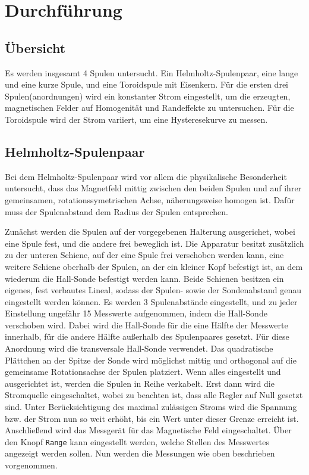\section{Durchführung}
\label{sec:Durchführung}
\subsection{Übersicht}
Es werden insgesamt 4 Spulen untersucht. Ein Helmholtz-Spulenpaar, eine lange und eine kurze Spule, und eine Toroidspule mit Eisenkern.
Für die ersten drei Spulen(anordnungen) wird ein konstanter Strom eingestellt, um die erzeugten, magnetischen Felder auf Homogenität und Randeffekte zu untersuchen.
Für die Toroidspule wird der Strom variiert, um eine Hysteresekurve zu messen.

\subsection{Helmholtz-Spulenpaar}
Bei dem Helmholtz-Spulenpaar wird vor allem die physikalische Besonderheit untersucht, dass das Magnetfeld mittig zwischen den beiden Spulen und auf
ihrer gemeinsamen, rotationssymetrischen Achse, näherungsweise homogen ist. Dafür muss der Spulenabstand dem Radius der Spulen entsprechen.

Zunächst werden die Spulen auf der vorgegebenen Halterung ausgerichet, wobei eine Spule fest, und die andere frei beweglich ist. Die Apparatur besitzt zusätzlich zu der unteren Schiene, 
auf der eine Spule frei verschoben werden kann, eine weitere Schiene oberhalb der Spulen, an der ein kleiner Kopf befestigt ist, an dem wiederum die Hall-Sonde befestigt werden kann.
Beide Schienen besitzen ein eigenes, fest verbautes Lineal, sodass der Spulen- sowie der Sondenabstand genau eingestellt werden können.
Es werden 3 Spulenabstände eingestellt, und zu jeder Einstellung ungefähr 15 Messwerte aufgenommen, indem die Hall-Sonde verschoben wird. Dabei wird die Hall-Sonde für die eine Hälfte der Messwerte innerhalb,
für die andere Hälfte außerhalb des Spulenpaares gesetzt.
Für diese Anordnung wird die transversale Hall-Sonde verwendet. Das quadratische Plättchen an der Spitze der Sonde wird möglichst mittig und orthogonal auf die gemeinsame Rotationsachse der Spulen platziert.
Wenn alles eingestellt und ausgerichtet ist, werden die Spulen in Reihe verkabelt. Erst dann wird die Stromquelle eingeschaltet, wobei zu beachten ist, dass alle Regler auf Null gesetzt sind.
Unter Berücksichtigung des maximal zulässigen Stroms wird die Spannung bzw. der Strom nun so weit erhöht, bis ein Wert unter dieser Grenze erreicht ist.
Anschließend wird das Messgerät für das Magnetische Feld eingeschaltet. Über den Knopf \texttt{Range} kann eingestellt werden, welche Stellen des Messwertes angezeigt werden sollen.
Nun werden die Messungen wie oben beschrieben vorgenommen.



